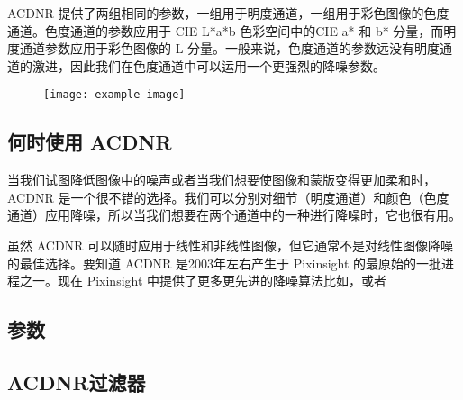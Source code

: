 ACDNR 提供了两组相同的参数，一组用于明度通道，一组用于彩色图像的色度通道。色度通道的参数应用于 CIE L*a*b 色彩空间中的CIE a* 和 b* 分量，而明度通道参数应用于彩色图像的 L 分量。一般来说，色度通道的参数远没有明度通道的激进，因此我们在色度通道中可以运用一个更强烈的降噪参数。

\begin{figure}[h]
  \centering
  \texttt{[image: example-image]}
\end{figure}


\subsection{何时使用 ACDNR}

当我们试图降低图像中的噪声或者当我们想要使图像和蒙版变得更加柔和时，ACDNR 是一个很不错的选择。我们可以分别对细节（明度通道）和颜色（色度通道）应用降噪，所以当我们想要在两个通道中的一种进行降噪时，它也很有用。

虽然 ACDNR 可以随时应用于线性和非线性图像，但它通常不是对线性图像降噪的最佳选择。要知道 ACDNR 是2003年左右产生于 Pixinsight 的最原始的一批进程之一。现在 Pixinsight 中提供了更多更先进的降噪算法比如，或者 


\subsection{参数}


\subsection{ACDNR过滤器}

